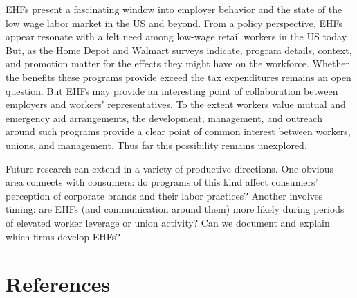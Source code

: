 \documentclass[
  11pt,
  oneside]{article}
\begin{document}
EHFs present a fascinating window into employer behavior and the state of the low wage labor market in the US and beyond. From a policy perspective, EHFs appear resonate with a felt need among low-wage retail workers in the US today. But, as the Home Depot and Walmart surveys indicate, program details, context, and promotion matter for the effects they might have on the workforce. Whether the benefits these programs provide exceed the tax expenditures remains an open question. But EHFs may provide an interesting point of collaboration between employers and workers' representatives. To the extent workers value mutual and emergency aid arrangements, the development, management, and outreach around such programs provide a clear point of common interest between workers, unions, and management. Thus far this possibility remains unexplored.

Future research can extend in a variety of productive directions. One obvious area connects with consumers: do programs of this kind affect consumers' perception of corporate brands and their labor practices? Another involves timing: are EHFs (and communication around them) more likely during periods of elevated worker leverage or union activity? Can we document and explain which firms develop EHFs?

\section*{References}\label{references}
\end{document}
